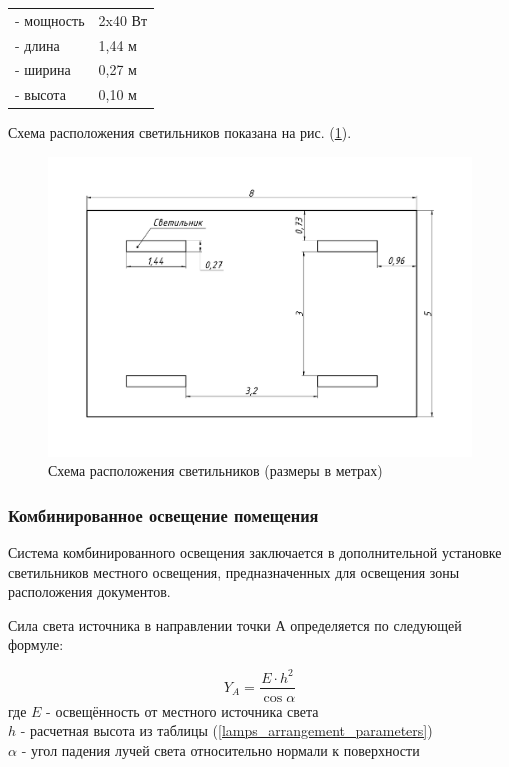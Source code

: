 \begin{tabular}{ll}
    - мощность    & 2x40 Вт   \\
    - длина       & 1,44 м    \\
    - ширина      & 0,27 м    \\
    - высота      & 0,10 м    \\
\end{tabular}

Схема расположения светильников показана на рис. (\ref{pic_lamps_arrangement}).

\begin{figure}[ht]
    \centering
    \includegraphics[width=\textwidth, keepaspectratio, clip=true, trim=0mm 25mm 0mm 20mm]
                    {./src/ecology/pictures/lights_arrangement}
    \caption{Схема расположения светильников (размеры в метрах)}
    \label{pic_lamps_arrangement}
\end{figure}


\subsubsection{Комбинированное освещение помещения}

Система комбинированного освещения заключается в дополнительной установке
светильников местного освещения, предназначенных для освещения зоны расположения
документов.

Сила света источника в направлении точки А определяется по следующей формуле:

\begin{equation}
    Y_A = \frac{E \cdot h^2}{\cos \alpha}
    \label{light_source_power_in_dot_direction}
\end{equation}
где $E$ - освещённость от местного источника света                      \\
$h$ - расчетная высота из таблицы (\ref{lamps_arrangement_parameters})  \\
$\alpha$ -  угол падения лучей света относительно нормали к поверхности

